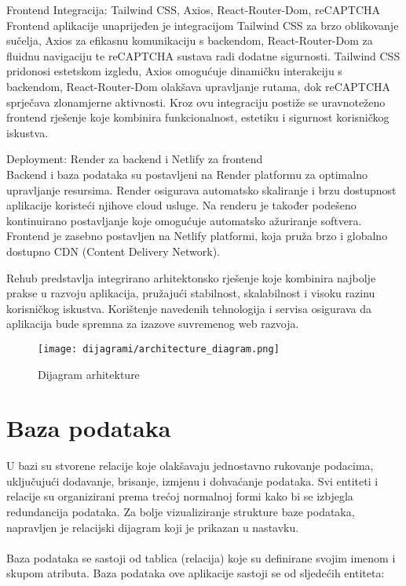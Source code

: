 \begin{packed_item}
                \large \item Frontend Integracija: Tailwind CSS, Axios, React-Router-Dom, reCAPTCHA \normalsize \\
                    Frontend aplikacije unaprijeđen je integracijom Tailwind CSS za brzo oblikovanje sučelja, Axios za efikasnu komunikaciju s backendom, React-Router-Dom za fluidnu navigaciju te reCAPTCHA sustava radi dodatne sigurnosti. Tailwind CSS pridonosi estetskom izgledu, Axios omogućuje dinamičku interakciju s backendom, React-Router-Dom olakšava upravljanje rutama, dok reCAPTCHA sprječava zlonamjerne aktivnosti. Kroz ovu integraciju postiže se uravnoteženo frontend rješenje koje kombinira funkcionalnost, estetiku i sigurnost korisničkog iskustva. \\
                \large \item Deployment: Render za backend i Netlify za frontend \normalsize \\
                    Backend i baza podataka su postavljeni na Render platformu za optimalno upravljanje resursima. Render osigurava automatsko skaliranje i brzu dostupnost aplikacije koristeći njihove cloud usluge. Na renderu je također podešeno kontinuirano postavljanje koje omogućuje automatsko ažuriranje softvera. Frontend je zasebno postavljen na Netlify platformi, koja pruža brzo i globalno dostupno CDN (Content Delivery Network). \\
            \end{packed_item}

            Rehub predstavlja integrirano arhitektonsko rješenje koje kombinira najbolje prakse u razvoju aplikacija, pružajući stabilnost, skalabilnost i visoku razinu korisničkog iskustva. Korištenje navedenih tehnologija i servisa osigurava da aplikacija bude spremna za izazove suvremenog web razvoja.
           

                
            
                \begin{figure}[H]
			         \texttt{[image: dijagrami/architecture\_diagram.png]}
			         \centering
			         \caption{Dijagram arhitekture}
			         \label{fig:architecture_diagram}
		        \end{figure}

		\section{Baza podataka}
			
		U bazi su stvorene relacije koje olakšavaju jednostavno rukovanje podacima, uključujući dodavanje, brisanje, izmjenu i dohvaćanje podataka. Svi entiteti i relacije su organizirani prema trećoj normalnoj formi kako bi se izbjegla redundancija podataka. Za bolje vizualiziranje strukture baze podataka, napravljen je relacijski dijagram koji je prikazan u nastavku. \\
        \\
        Baza podataka se sastoji od tablica (relacija) koje su definirane svojim imenom i skupom
atributa. Baza podataka ove aplikacije sastoji se od sljedećih entiteta:

